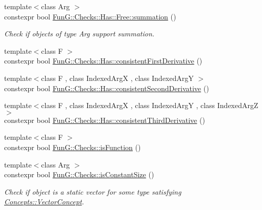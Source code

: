 \begin{DoxyCompactItemize}
{\footnotesize template$<$class Arg $>$ }\\constexpr bool \hyperlink{namespaceFunG_1_1Checks_1_1Has_1_1Free_a1cf46f7335354d21dff506aaf812b4f5}{Fun\+G\+::\+Checks\+::\+Has\+::\+Free\+::summation} ()
\begin{DoxyCompactList}\small\item\em Check if objects of type Arg support summation. \end{DoxyCompactList}\item 
{\footnotesize template$<$class F $>$ }\\constexpr bool \hyperlink{namespaceFunG_1_1Checks_1_1Has_a3c61b3f75ad634464322f21e8acb4e5d}{Fun\+G\+::\+Checks\+::\+Has\+::consistent\+First\+Derivative} ()
\item 
{\footnotesize template$<$class F , class Indexed\+ArgX , class Indexed\+ArgY $>$ }\\constexpr bool \hyperlink{namespaceFunG_1_1Checks_1_1Has_ab4a78fd7a1175707d748445785a0d37c}{Fun\+G\+::\+Checks\+::\+Has\+::consistent\+Second\+Derivative} ()
\item 
{\footnotesize template$<$class F , class Indexed\+ArgX , class Indexed\+ArgY , class Indexed\+ArgZ $>$ }\\constexpr bool \hyperlink{namespaceFunG_1_1Checks_1_1Has_abf6a73e1b599a4aac525bb20931aea4f}{Fun\+G\+::\+Checks\+::\+Has\+::consistent\+Third\+Derivative} ()
\item 
{\footnotesize template$<$class F $>$ }\\constexpr bool \hyperlink{group__ConceptGroup_gac6e6c5574a8497cc0749e5a613e4d57c}{Fun\+G\+::\+Checks\+::is\+Function} ()
\item 
{\footnotesize template$<$class Arg $>$ }\\constexpr bool \hyperlink{group__ConceptGroup_gadcc3e179af2ed0384a3773ea086045b9}{Fun\+G\+::\+Checks\+::is\+Constant\+Size} ()
\begin{DoxyCompactList}\small\item\em Check if object is a static vector for some type satisfying \hyperlink{structFunG_1_1Concepts_1_1VectorConcept}{Concepts\+::\+Vector\+Concept}. \end{DoxyCompactList}\end{DoxyCompactItemize}
